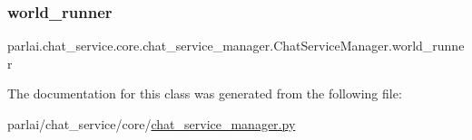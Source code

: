 \subsubsection{\texorpdfstring{world\+\_\+runner}{world\_runner}}
{\footnotesize\ttfamily parlai.\+chat\+\_\+service.\+core.\+chat\+\_\+service\+\_\+manager.\+Chat\+Service\+Manager.\+world\+\_\+runner}



The documentation for this class was generated from the following file\+:\begin{DoxyCompactItemize}
\item 
parlai/chat\+\_\+service/core/\hyperlink{chat__service__manager_8py}{chat\+\_\+service\+\_\+manager.\+py}\end{DoxyCompactItemize}
